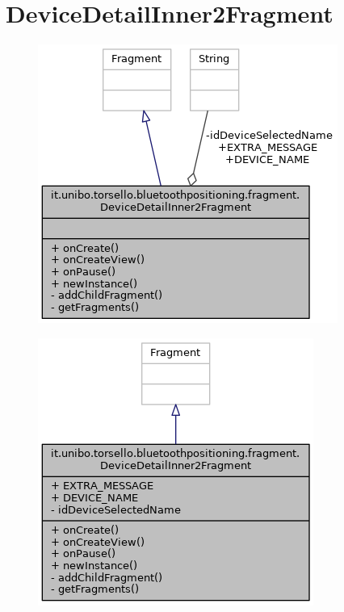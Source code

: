 \newpage
\section{DeviceDetailInner2Fragment}
\begin{figure}[ph]
	\centering
	\includegraphics[width=0.7\linewidth]{img/uml/class/classit_1_1unibo_1_1torsello_1_1bluetoothpositioning_1_1fragment_1_1DeviceDetailInner2Fragment__coll__graph.png}
	\caption{}
\end{figure}

\begin{figure}[ph]
	\centering
	\includegraphics[width=0.5\linewidth]{img/uml/class/classit_1_1unibo_1_1torsello_1_1bluetoothpositioning_1_1fragment_1_1DeviceDetailInner2Fragment__inherit__graph.png}
	\caption{}
\end{figure}

\newpage
